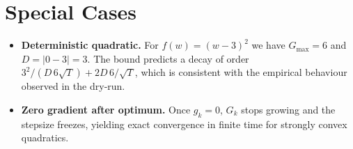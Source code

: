 \documentclass{article}
\begin{document}
\section*{Special Cases}
\begin{itemize}
\item \textbf{Deterministic quadratic.} For $f(w)=(w-3)^{2}$ we have $G_{\max}=6$ and
  $D=|0-3|=3$.  The bound predicts a decay of order $3^{2}/(D\,6\sqrt{T})+2D\,6/\sqrt{T}$,
  which is consistent with the empirical behaviour observed in the dry‑run.
\item \textbf{Zero gradient after optimum.} Once $g_k=0$, $G_k$ stops growing and the
  stepsize freezes, yielding exact convergence in finite time for strongly convex
  quadratics.
\end{itemize}
\end{document}
